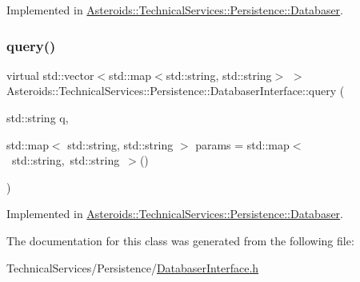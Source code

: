 Implemented in \hyperlink{classAsteroids_1_1TechnicalServices_1_1Persistence_1_1Databaser_aa7dc4f3b86f7966260d6f5d391d4a3ba}{Asteroids\+::\+Technical\+Services\+::\+Persistence\+::\+Databaser}.

\mbox{\label{classAsteroids_1_1TechnicalServices_1_1Persistence_1_1DatabaserInterface_a8405defffe62181ae654b65bbe45d1c9}} 
\subsubsection{\texorpdfstring{query()}{query()}}
{\footnotesize\ttfamily virtual std\+::vector$<$std\+::map$<$std\+::string, std\+::string$>$ $>$ Asteroids\+::\+Technical\+Services\+::\+Persistence\+::\+Databaser\+Interface\+::query (\begin{DoxyParamCaption}\item[{std\+::string}]{q,  }\item[{std\+::map$<$ std\+::string, std\+::string $>$}]{params = {\ttfamily std\+:\+:map$<$~std\+:\+:string,~std\+:\+:string~$>$()} }\end{DoxyParamCaption})\hspace{0.3cm}{\ttfamily [pure virtual]}}



Implemented in \hyperlink{classAsteroids_1_1TechnicalServices_1_1Persistence_1_1Databaser_a0686831c03a3eabced8649a2e189fef1}{Asteroids\+::\+Technical\+Services\+::\+Persistence\+::\+Databaser}.



The documentation for this class was generated from the following file\+:\begin{DoxyCompactItemize}
\item 
Technical\+Services/\+Persistence/\hyperlink{DatabaserInterface_8h}{Databaser\+Interface.\+h}\end{DoxyCompactItemize}
